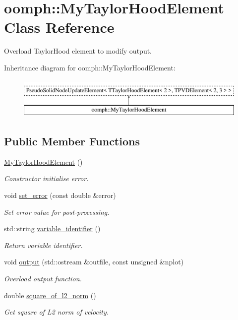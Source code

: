 \hypertarget{classoomph_1_1MyTaylorHoodElement}{}\section{oomph\+:\+:My\+Taylor\+Hood\+Element Class Reference}
\label{classoomph_1_1MyTaylorHoodElement}


Overload Taylor\+Hood element to modify output.  


Inheritance diagram for oomph\+:\+:My\+Taylor\+Hood\+Element\+:\begin{figure}[H]
\begin{center}
\leavevmode
\includegraphics[height=2.000000cm]{classoomph_1_1MyTaylorHoodElement}
\end{center}
\end{figure}
\subsection*{Public Member Functions}
\begin{DoxyCompactItemize}
\item 
\hyperlink{classoomph_1_1MyTaylorHoodElement_a936bd6421ba42e5b73f983f5141b37c2}{My\+Taylor\+Hood\+Element} ()
\begin{DoxyCompactList}\small\item\em Constructor initialise error. \end{DoxyCompactList}\item 
void \hyperlink{classoomph_1_1MyTaylorHoodElement_ae4f6eea59b7bcf6e737d829b37c47fe9}{set\+\_\+error} (const double \&error)
\begin{DoxyCompactList}\small\item\em Set error value for post-\/processing. \end{DoxyCompactList}\item 
std\+::string \hyperlink{classoomph_1_1MyTaylorHoodElement_a429987090e76cd39a657b3a8eefbbbe9}{variable\+\_\+identifier} ()
\begin{DoxyCompactList}\small\item\em Return variable identifier. \end{DoxyCompactList}\item 
void \hyperlink{classoomph_1_1MyTaylorHoodElement_a5505717f2d16c2b231e7c347cb0c49b1}{output} (std\+::ostream \&outfile, const unsigned \&nplot)
\begin{DoxyCompactList}\small\item\em Overload output function. \end{DoxyCompactList}\item 
double \hyperlink{classoomph_1_1MyTaylorHoodElement_ad9efcab0ef22434e6fc5f2eb4b84643d}{square\+\_\+of\+\_\+l2\+\_\+norm} ()
\begin{DoxyCompactList}\small\item\em Get square of L2 norm of velocity. \end{DoxyCompactList}\end{DoxyCompactItemize}
